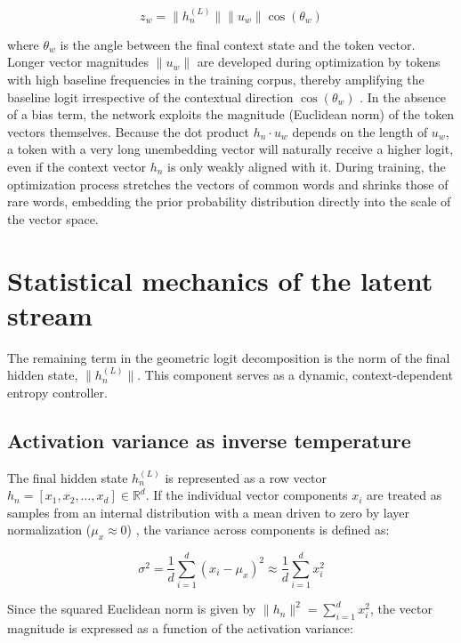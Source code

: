 \documentclass[11pt,a4paper]{article}
\begin{document}
	\begin{equation}
		z_w = \|h_n^{(L)}\| \|u_w\| \cos(\theta_w)
	\end{equation}
	
	where $\theta_w$ is the angle between the final context state and the token vector. Longer vector magnitudes $\|u_w\|$ are developed during optimization by tokens with high baseline frequencies in the training corpus, thereby amplifying the baseline logit irrespective of the contextual direction $\cos(\theta_w)$ \citep{gao2019representation}. In the absence of a bias term, the network exploits the magnitude (Euclidean norm) of the token vectors themselves. Because the dot product $h_n \cdot u_w$ depends on the length of $u_w$, a token with a very long unembedding vector will naturally receive a higher logit, even if the context vector $h_n$ is only weakly aligned with it. During training, the optimization process stretches the vectors of common words and shrinks those of rare words, embedding the prior probability distribution directly into the scale of the vector space.
	
	\section{Statistical mechanics of the latent stream}
	
	The remaining term in the geometric logit decomposition is the norm of the final hidden state, $\|h_n^{(L)}\|$. This component serves as a dynamic, context-dependent entropy controller.
	
	\subsection{Activation variance as inverse temperature}
	The final hidden state $h_n^{(L)}$ is represented as a row vector $h_n = [x_1, x_2, \dots, x_d] \in \mathbb{R}^d$. If the individual vector components $x_i$ are treated as samples from an internal distribution with a mean driven to zero by layer normalization ($\mu_x \approx 0$) \citep{ba2016layernorm}, the variance across components is defined as:
	
	\begin{equation}
		\sigma^2 = \frac{1}{d} \sum_{i=1}^d (x_i - \mu_x)^2 \approx \frac{1}{d} \sum_{i=1}^d x_i^2
	\end{equation}
	
	Since the squared Euclidean norm is given by $\|h_n\|^2 = \sum_{i=1}^d x_i^2$, the vector magnitude is expressed as a function of the activation variance:
	
\end{document}
